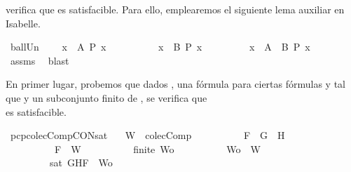 \begin{isabellebody}
\begin{isamarkuptext}
  verifica que  es satisfacible. Para ello, emplearemos el siguiente lema auxiliar
  en Isabelle.%
\end{isamarkuptext}\isamarkuptrue%
\isamarkupfalse%
\ ball{\isacharunderscore}Un{\isacharcolon}\ \isanewline
\ \ \ {\isachardoublequoteopen}{\isasymforall}x\ {\isasymin}\ A{\isachardot}\ P\ x{\isachardoublequoteclose}\isanewline
\ \ \ \ \ \ \ \ \ \ {\isachardoublequoteopen}{\isasymforall}x\ {\isasymin}\ B{\isachardot}\ P\ x{\isachardoublequoteclose}\isanewline
\ \ \ \ \ \ \ \ \ {\isachardoublequoteopen}{\isasymforall}x\ {\isasymin}\ {\isacharparenleft}A\ {\isasymunion}\ B{\isacharparenright}{\isachardot}\ P\ x{\isachardoublequoteclose}\ \isanewline
%
\isadelimproof
\ \ %
\endisadelimproof
%
\isatagproof
{}\isamarkupfalse%
\ assms\ \isamarkupfalse%
\ blast%
\endisatagproof
{\isafoldproof}%
%
\isadelimproof
%
\endisadelimproof
%
\begin{isamarkuptext}%
En primer lugar, probemos que dados , una fórmula  para ciertas fórmulas  
  y  tal que  y  un subconjunto finito de , se verifica que\\  es 
  satisfacible.%
\end{isamarkuptext}\isamarkuptrue%
\isamarkupfalse%
\ pcp{\isacharunderscore}colecComp{\isacharunderscore}CON{\isacharunderscore}sat{}{\isacharcolon}\isanewline
\ \ \ {\isachardoublequoteopen}W\ {\isasymin}\ colecComp{\isachardoublequoteclose}\isanewline
\ \ \ \ \ \ \ \ \ \ {\isachardoublequoteopen}F\ {\isacharequal}\ G\ \isactrlbold {\isasymand}\ H{\isachardoublequoteclose}\isanewline
\ \ \ \ \ \ \ \ \ \ {\isachardoublequoteopen}F\ {\isasymin}\ W{\isachardoublequoteclose}\isanewline
\ \ \ \ \ \ \ \ \ \ {\isachardoublequoteopen}finite\ Wo{\isachardoublequoteclose}\isanewline
\ \ \ \ \ \ \ \ \ \ {\isachardoublequoteopen}Wo\ {\isasymsubseteq}\ W{\isachardoublequoteclose}\isanewline
\ \ \ \ \ \ \ \ \ {\isachardoublequoteopen}sat\ {\isacharparenleft}{\isacharbraceleft}G{\isacharcomma}H{\isacharcomma}F{\isacharbraceright}\ {\isasymunion}\ Wo{\isacharparenright}{\isachardoublequoteclose}\isanewline

\end{isabellebody}
